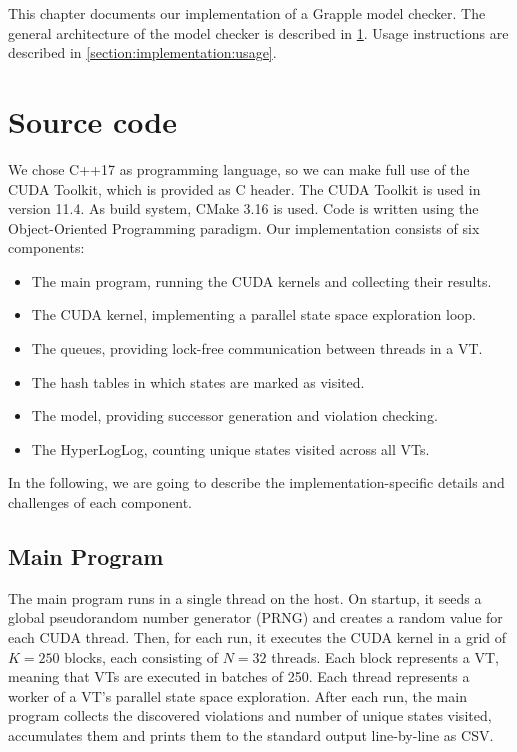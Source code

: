 \documentclass[
fancyheadings, %
%
%
]{stsreprt}
\begin{document}
This chapter documents our implementation of a Grapple model checker.
The general architecture of the model checker is described in \cref{section:implementation:source-code}.
Usage instructions are described in \cref{section:implementation:usage}.

\section{Source code}
\label{section:implementation:source-code}

We chose C++17 as programming language, so we can make full use of the CUDA Toolkit, which is provided as C header.
The CUDA Toolkit is used in version 11.4.
As build system, CMake 3.16 is used.
Code is written using the Object-Oriented Programming paradigm.
Our implementation consists of six components:

\begin{itemize}
    \item The main program, running the CUDA kernels and collecting their results.
    \item The CUDA kernel, implementing a parallel state space exploration loop.
    \item The queues, providing lock-free communication between threads in a VT.
    \item The hash tables in which states are marked as visited.
    \item The model, providing successor generation and violation checking.
    \item The HyperLogLog, counting unique states visited across all VTs.
\end{itemize}


In the following, we are going to describe the implementation-specific details and challenges of each component.

\subsection{Main Program}

The main program runs in a single thread on the host.
On startup, it seeds a global pseudorandom number generator (PRNG) and creates a random value for each CUDA thread.
Then, for each run, it executes the CUDA kernel in a grid of $K=250$ blocks, each consisting of $N=32$ threads.
Each block represents a VT, meaning that VTs are executed in batches of 250.
Each thread represents a worker of a VT's parallel state space exploration.
After each run, the main program collects the discovered violations and number of unique states visited, accumulates them and prints them to the standard output line-by-line as CSV.
\end{document}
